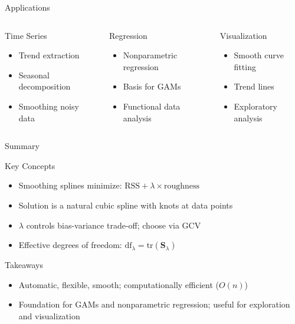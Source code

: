 \documentclass[aspectratio=169]{beamer}
\begin{document}
\begin{frame}{Applications}
\small
\setlength{\itemsep}{2pt}
\begin{columns}[T]
\begin{block}{Time Series}
\begin{itemize}
    \item Trend extraction
    \item Seasonal decomposition
    \item Smoothing noisy data
\end{itemize}
\end{block}
\begin{block}{Regression}
\begin{itemize}
    \item Nonparametric regression
    \item Basis for GAMs
    \item Functional data analysis
\end{itemize}
\end{block}
\begin{block}{Visualization}
\begin{itemize}
    \item Smooth curve fitting
    \item Trend lines
    \item Exploratory analysis
\end{itemize}
\end{block}
\end{columns}
\end{frame}

\begin{frame}{Summary}
\small
\setlength{\itemsep}{3pt}
\begin{block}{Key Concepts}
\begin{itemize}
    \item Smoothing splines minimize: $\text{RSS} + \lambda \times \text{roughness}$
    \item Solution is a natural cubic spline with knots at data points
    \item $\lambda$ controls bias-variance trade-off; choose via GCV
    \item Effective degrees of freedom: $\text{df}_\lambda = \text{tr}(\mathbf{S}_\lambda)$
\end{itemize}
\end{block}
\vspace{-2pt}
\begin{block}{Takeaways}
\begin{itemize}
    \item Automatic, flexible, smooth; computationally efficient ($O(n)$)
    \item Foundation for GAMs and nonparametric regression; useful for exploration and visualization
\end{itemize}
\end{block}
\end{frame}
\end{document}
